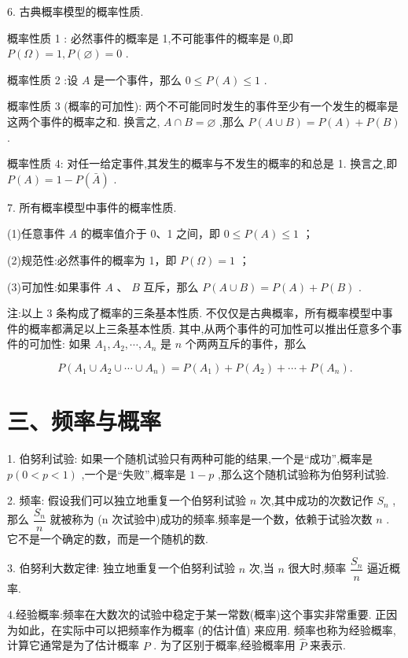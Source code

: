 6. 古典概率模型的概率性质.

概率性质 1 : 必然事件的概率是 1,不可能事件的概率是 0,即 $P\left( \Omega \right)  = 1,P\left( \varnothing \right)  = 0$ .

概率性质 2 :设 $A$ 是一个事件，那么 $0 \leq  P\left( A\right)  \leq  1$ .

概率性质 3 (概率的可加性): 两个不可能同时发生的事件至少有一个发生的概率是这两个事件的概率之和. 换言之, $A \cap  B = \varnothing$ ,那么 $P\left( {A \cup  B}\right)  = P\left( A\right)  + P\left( B\right)$ .

概率性质 4: 对任一给定事件,其发生的概率与不发生的概率的和总是 1. 换言之,即 $P\left( A\right)  = 1 - P\left( \bar{A}\right)$ .

7. 所有概率模型中事件的概率性质.

(1)任意事件 $A$ 的概率值介于 0、1 之间，即 $0 \leq  P\left( A\right)  \leq  1$ ；

(2)规范性:必然事件的概率为 1，即 $P\left( \Omega \right)  = 1$ ；

(3)可加性:如果事件 $A$ 、 $B$ 互斥，那么 $P\left( {A \cup  B}\right)  = P\left( A\right)  + P\left( B\right)$ .

注:以上 3 条构成了概率的三条基本性质. 不仅仅是古典概率，所有概率模型中事件的概率都满足以上三条基本性质. 其中,从两个事件的可加性可以推出任意多个事件的可加性: 如果 ${A}_{1},{A}_{2},\cdots ,{A}_{n}$ 是 $n$ 个两两互斥的事件，那么

\[
P\left( {{A}_{1} \cup  {A}_{2} \cup  \cdots  \cup  {A}_{n}}\right)  = P\left( {A}_{1}\right)  + P\left( {A}_{2}\right)  + \cdots  + P\left( {A}_{n}\right) .
\]

\section*{三、频率与概率}

1. 伯努利试验: 如果一个随机试验只有两种可能的结果,一个是“成功”,概率是 $p\left( {0 < p < 1}\right)$ ,一个是“失败”,概率是 $1 - p$ ,那么这个随机试验称为伯努利试验.

2. 频率: 假设我们可以独立地重复一个伯努利试验 $n$ 次,其中成功的次数记作 ${S}_{n}$ ,那么 $\dfrac{{S}_{n}}{n}$ 就被称为 (n 次试验中)成功的频率.频率是一个数，依赖于试验次数 $n$ . 它不是一个确定的数，而是一个随机的数.

3. 伯努利大数定律: 独立地重复一个伯努利试验 $n$ 次,当 $n$ 很大时,频率 $\dfrac{{S}_{n}}{n}$ 逼近概率.

4.经验概率:频率在大数次的试验中稳定于某一常数(概率)这个事实非常重要. 正因为如此，在实际中可以把频率作为概率 (的估计值) 来应用. 频率也称为经验概率,计算它通常是为了估计概率 $P$ . 为了区别于概率,经验概率用 $\widehat{P}$ 来表示.


